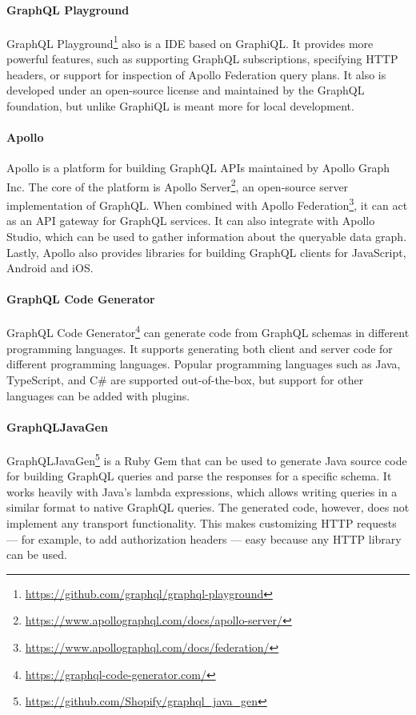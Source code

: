\paragraph{GraphQL Playground}

GraphQL Playground\footnote{\url{https://github.com/graphql/graphql-playground}} also is a \ac{IDE} based on GraphiQL.%
It provides more powerful features, such as supporting GraphQL subscriptions, specifying \ac{HTTP} headers, or support for inspection of Apollo Federation query plans.
It also is developed under an open-source license and maintained by the GraphQL foundation, but unlike GraphiQL is meant more for local development.

\paragraph{Apollo}

Apollo is a platform for building GraphQL \acp{API} maintained by Apollo Graph Inc.
The core of the platform is Apollo Server\footnote{\url{https://www.apollographql.com/docs/apollo-server/}}, an open-source server implementation of GraphQL.%
When combined with Apollo Federation\footnote{\url{https://www.apollographql.com/docs/federation/}}, it can act as an \ac{API} gateway for GraphQL services.
It can also integrate with Apollo Studio, which can be used to gather information about the queryable data graph.
Lastly, Apollo also provides libraries for building GraphQL clients for JavaScript, Android and iOS.%

\paragraph{GraphQL Code Generator}

GraphQL Code Generator\footnote{\url{https://graphql-code-generator.com/}} can generate code from GraphQL schemas in different programming languages.
It supports generating both client and server code for different programming languages.
Popular programming languages such as Java, TypeScript, and C\# are supported out-of-the-box, but support for other languages can be added with plugins.

\paragraph{GraphQLJavaGen}

GraphQLJavaGen\footnote{\url{https://github.com/Shopify/graphql_java_gen}} is a Ruby Gem that can be used to generate Java source code for building GraphQL queries and parse the responses for a specific schema.
It works heavily with Java's lambda expressions, which allows writing queries in a similar format to native GraphQL queries.
The generated code, however, does not implement any transport functionality.
This makes customizing \ac{HTTP} requests --- for example, to add authorization headers --- easy because any \ac{HTTP} library can be used.